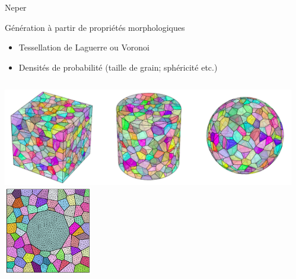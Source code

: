 \documentclass[11pt,aspectratio=1610]{beamer}
\begin{document}
\begin{frame}{Neper}
  \begin{block}{Génération à partir de propriétés morphologiques \cite{Neper,Neper_Bimodal}}
    \begin{itemize}
    \item Tessellation de Laguerre ou Voronoi
    \item Densités de probabilité (taille de grain; sphéricité etc.)
    \end{itemize}
    \begin{columns}
      \begin{column}{0.45\linewidth}
        \begin{center}
          \includegraphics[width=0.95\linewidth]{pngFigures/neper_volumes.png} \\
          \includegraphics[width=0.3\textwidth]{pngFigures/neper_bimodal}
        \end{center}
      \end{column}
      \begin{column}{0.25\linewidth}
        \centering

\end{column}
\end{columns}
\end{block}
\end{frame}
\end{document}
